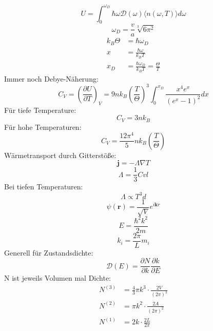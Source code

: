 \documentclass[11pt]{article}
\begin{document}
\begin{equation}
  U=\int_0^{\omega_D}\hbar\omega\mathcal{D}(\omega)\langle n(\omega,T)\rangle
  d\omega
\end{equation}
\begin{equation}
  \omega_D=\frac{v}{a}\sqrt[3]{6\pi^2}
\end{equation}
\begin{equation}
  \begin{align}
    k_B\Theta&=\hbar\omega_D \\
    x&=\frac{\hbar\omega}{k_BT}\\
    x_D&=\frac{\hbar\omega_D}{k_BT}=\frac{\Theta}{T}
  \end{align}
\end{equation}
Immer noch Debye-Näherung:
\begin{equation}
  C_V=\left(\frac{\partial U}{\partial T}\right)_V=
  9nk_B\left(\frac{T}{\Theta}\right)^3\int_0^{x_D}\frac{x^4e^x}{(e^x-1)^2}dx
\end{equation}
Für tiefe Temperature:
\begin{equation}
  C_V=3nk_B
\end{equation}
Für hohe Temperaturen:
\begin{equation}
  C_V=\frac{12\pi^4}{5}{nk_B}\left(\frac{T}{\Theta}\right)
\end{equation}
Wärmetransport durch Gitterstöße:
\begin{equation}
  \bm{j}=-\Lambda\nabla T
\end{equation}
\begin{equation}
  \Lambda=\frac{1}{3}Cvl
\end{equation}
Bei tiefen Temperaturen:
\begin{equation}
  \Lambda\propto T^3d
\end{equation}
\begin{equation}
  \psi(\bm{r})=\frac{1}{\sqrt{V}}e^{i\bm{k}{r}}
\end{equation}
\begin{equation}
  E=\frac{\hbar^2k^2}{2m}
\end{equation}
\begin{equation}
  k_i=\frac{2\pi}{L}m_i
\end{equation}
Generell für Zustandsdichte:
\begin{equation}
  \mathcal{D}(E)=\frac{\partial N}{\partial k}\frac{\partial k}{\partial E}
\end{equation}
N ist jeweils Volumen mal Dichte:
\begin{equation}
  \begin{align}
    N^{(3)}&=\frac{4}{3}\pi k^3\cdot\frac{2V}{(2\pi)^3} \\
    N^{(2)}&=\pi k^2\cdot\frac{2A}{(2\pi)^2} \\
    N^{(1)}&=2k\cdot\frac{2L}{2\pi}
  \end{align}
\end{equation}
\end{document}
